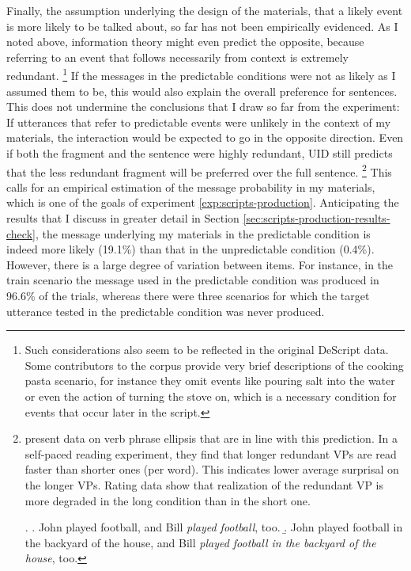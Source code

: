 Finally, the assumption underlying the design of the materials, that a likely event is more likely to be talked about, so far has not been empirically evidenced. As I noted above, information theory might even predict the opposite, because referring to an event that follows necessarily from context is extremely redundant.%
%
\footnote{Such considerations also seem to be reflected in the original DeScript data. Some contributors to the corpus provide very brief descriptions of the cooking pasta scenario, for instance they omit events like pouring salt into the water or even the action of turning the stove on, which is a necessary condition for events that occur later in the script.}\afterfn%
%
If the messages in the predictable conditions were not as likely as I assumed them to be, this would also explain the overall preference for sentences. This does not undermine the conclusions that I draw so far from the experiment: If utterances that refer to predictable events were unlikely in the context of my materials, the interaction would be expected to go in the opposite direction. Even if both the fragment and the sentence were highly redundant, UID still predicts that the less redundant fragment will be preferred over the full sentence.%
%
\footnote{\citet{schafer.etalunderreview} present data on verb phrase ellipsis that are in line with this prediction. In a self-paced reading experiment, they find that longer redundant VPs \Next[a] are read faster than shorter ones \Next[b] (per word). This indicates lower average surprisal on the longer VPs. Rating data show that realization of the redundant VP is more degraded in the long condition than in the short one.

\ex. \a. John played football, and Bill \textit{played football}, too.
    \b.  John played football in the backyard of the house, and Bill \textit{played football in the backyard of the house}, too.

}\afterfn%
% 
This calls for an empirical estimation of the message probability in my materials, which is one of the goals of experiment \ref{exp:scripts-production}. Anticipating the results that I discuss in greater detail in Section \ref{sec:scripts-production-results-check}, the message underlying my materials in the predictable condition is indeed more likely (19.1\%) than that in the unpredictable condition (0.4\%). However, there is a large degree of variation between items. For instance, in the train scenario the message used in the predictable condition was produced in 96.6\% of the trials, whereas there were three scenarios for which the target utterance tested in the predictable condition was never produced.

